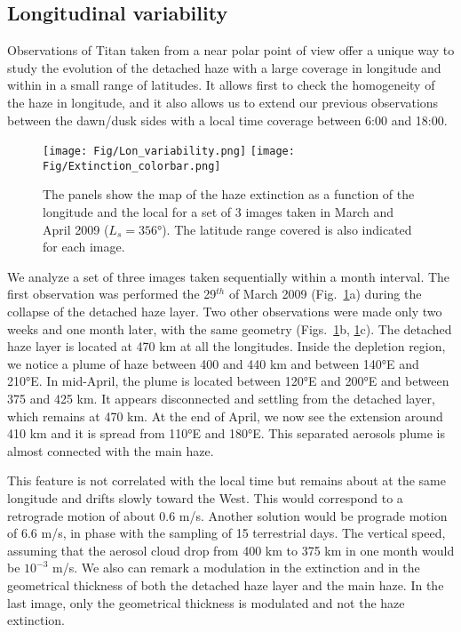 \subsection{Longitudinal variability}

Observations of Titan taken from a near polar point of view offer a unique way to study the evolution of
the detached haze with a large coverage in longitude and within in a small range of latitudes. It allows
first to check the homogeneity of the haze in longitude, and it also allows us to extend our previous
observations between the dawn/dusk sides with a local time coverage between 6:00 and 18:00.

\begin{figure}[!ht]
    \centering
    \texttt{[image: Fig/Lon\_variability.png]}
    \texttt{[image: Fig/Extinction\_colorbar.png]}\vspace{-.3cm}
    \caption{The panels show the map of the haze extinction as a function of the longitude and the local
    for a set of 3 images taken in March and April 2009 ($L_s=\ang{356}$). The latitude range covered is
    also indicated for each image.}
    \label{fig:lon_variability}
\end{figure}

We analyze a set of three images taken sequentially within a month interval. The first observation
was performed the 29$^{th}$ of March 2009 (Fig.~\ref{fig:lon_variability}a) during the collapse of the detached
haze layer. Two other observations were made only two weeks and one month later, with the same geometry
(Figs.~\ref{fig:lon_variability}b, \ref{fig:lon_variability}c). The detached haze layer is
located at 470 km at all the longitudes. Inside the depletion region, we notice a plume of haze
between 400 and 440 km and between \ang{140}E and \ang{210}E. In mid-April, the plume is located between
\ang{120}E and \ang{200}E and between 375 and 425 km. It appears disconnected and settling from the detached
layer, which remains at 470 km. At the end of April, we now see the extension around 410 km and it
is spread from \ang{110}E and \ang{180}E. This separated aerosols plume is almost connected with the main haze.

This feature is not correlated with the local time but remains about at the same longitude and drifts slowly
toward the West. This would correspond to a retrograde motion of about 0.6 m/s. Another solution would be
prograde motion of 6.6 m/s, in phase with the sampling of 15 terrestrial days. The vertical speed, assuming
that the aerosol cloud drop from 400 km to 375 km in one month would be $10^{-3}$ m/s. We also can remark a
modulation in the extinction and in the geometrical thickness of both the detached haze layer and the main
haze. In the last image, only the geometrical thickness is modulated and not the haze extinction.

